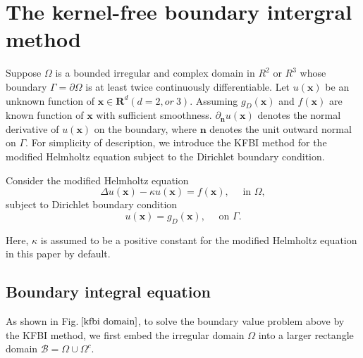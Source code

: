 \section{The kernel-free boundary intergral method} \label{KFBI}
Suppose $\Omega$ is a bounded irregular and complex domain in $R^2$ or $R^3$ whose boundary $\Gamma = \partial \Omega$ is at least twice continuously differentiable. Let $u(\mathbf{x})$ be an unknown function of $\mathbf{x} \in \mathbf{R}^{d}(d=2, or ~3)$. Assuming $g_{D}(\mathbf{x})$ and $f(\mathbf{x})$ are known function of $\mathbf{x}$  with sufficient smoothness. $\partial_{\mathbf{n}}u(\mathbf{x})$ denotes the normal derivative of $u(\mathbf{x})$ on the boundary, where $\mathbf{n}$ denotes the unit outward normal on $\Gamma$. For simplicity of description, we introduce the KFBI method for the modified Helmholtz equation subject to the Dirichlet boundary condition. 

Consider the modified Helmholtz equation 
\begin{equation}
    \Delta u(\mathbf{x})-\kappa u(\mathbf{x})=f(\mathbf{x}), \quad \text { in } \Omega,
    \label{one_GPU:modified_helmholtz}
\end{equation}
subject to Dirichlet boundary condition 
\begin{equation}
    u(\mathbf{x}) = g_{D}(\mathbf{x}), \quad \text{ on }\Gamma.
    \label{one_GPU:dirichlet_boundary}
\end{equation}

Here, $\kappa$ is assumed to be a positive constant for the modified Helmholtz equation in this paper by default.

\subsection{Boundary integral equation}
As shown in Fig.\,$\ref{kfbi domain}$, to solve the boundary value problem above by the KFBI method, we first embed the irregular domain $\Omega$ into a larger rectangle domain $\mathcal{B} = \Omega \cup \Omega^{c}$. 

